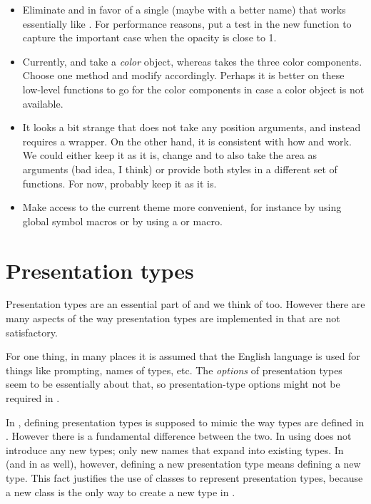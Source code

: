 \begin{itemize}
\item Eliminate  and  in
  favor of a single  (maybe with a better name)
  that works essentially like .  For
  performance reasons, put a test in the new function to capture the
  important case when the opacity is close to 1. 

\item Currently,  and  take
  a \emph{color} object, whereas  takes the three
  color components.  Choose one method and modify accordingly.
  Perhaps it is better on these low-level functions to go for the
  color components in case a color object is not available. 

\item It looks a bit strange that  does not take any
  position arguments, and instead requires a 
  wrapper.  On the other hand, it is consistent with how
   and  work.  We could
  either keep it as it is, change  and
   to also take the area as arguments (bad
  idea, I think) or provide both styles in a different set of
  functions.   For now, probably keep it as it is.

\item Make access to the current theme more convenient, for instance
  by using global symbol macros or by using a  or
   macro.

\end{itemize}

\section{Presentation types}

Presentation types are an essential part of \climtwo{} and we think of
\clim{} too.  However there are many aspects of the way presentation
types are implemented in \climtwo{} that are not satisfactory. 

For one thing, in many places it is assumed that the English language
is used for things like prompting, names of types, etc.  The
\emph{options} of presentation types seem to be essentially about
that, so presentation-type options might not be required in \clim{}.  

In \climtwo{}, defining presentation types is supposed to mimic the
way types are defined in \cl{}.  However there is a fundamental
difference between the two.  In \cl{} using  does not
introduce any new types; only new names that expand into existing
types.  In \climtwo{} (and in \clim{} as well), however, defining a
new presentation type means defining a new type.  This fact justifies
the use of classes to represent presentation types, because a new
class is the only way to create a new type in \cl{}.  

